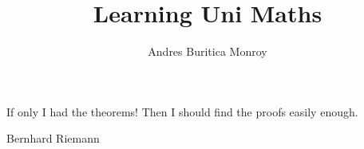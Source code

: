 \documentclass{amsbook}
\title{Learning Uni Maths}
\author{Andres Buritica Monroy}
\theoremstyle{definition}
\begin{document}
\maketitle
\epigraph{If only I had the theorems! Then I should find the proofs easily
enough.}{Bernhard Riemann}
\tableofcontents

\appendix

\end{document}
